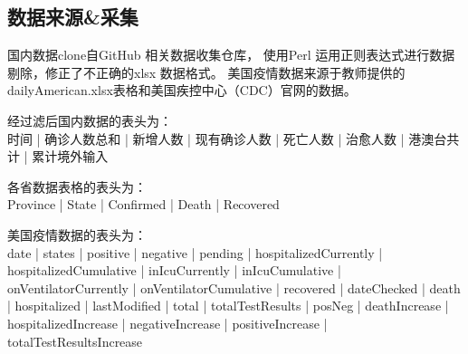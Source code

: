 \documentclass[UTF8]{ctexart}
\begin{document}
\begin{table}[]
    \centering
    \end{table}

\subsection{数据来源\&采集}
国内数据clone自GitHub 相关数据收集仓库\cite{bib1}，
使用Perl 运用正则表达式进行数据剔除，修正了不正确的xlsx 数据格式。
美国疫情数据来源于教师提供的dailyAmerican.xlsx表格和美国疾控中心（CDC）官网\cite{usaCdc}的数据。
\\
\par 经过滤后国内数据的表头为：
\\
 时间 | 确诊人数总和 | 新增人数 | 现有确诊人数 |
死亡人数 | 治愈人数	 | 港澳台共计 | 累计境外输入
\\
\par 各省数据表格的表头为：
\\
Province | State | Confirmed | Death | Recovered
\\
\par 美国疫情数据的表头为：
\\
date | states | positive | negative | pending | hospitalizedCurrently | hospitalizedCumulative | inIcuCurrently | inIcuCumulative | onVentilatorCurrently | onVentilatorCumulative | recovered | dateChecked | death | hospitalized | lastModified | total | totalTestResults | posNeg | deathIncrease | hospitalizedIncrease | negativeIncrease | positiveIncrease | totalTestResultsIncrease 
\\\hspace*{\fill}\\
\end{document}
